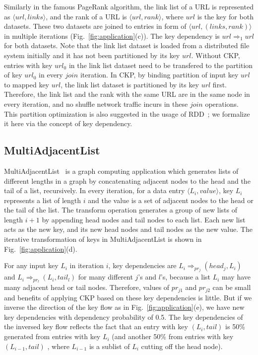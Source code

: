 \documentclass[10pt,journal,compsoc]{IEEEtran}
\begin{document}
Similarly in the famous PageRank algorithm, 
the link list of a URL is represented as $\langle url, links \rangle$,
and the rank of a URL is $\langle url, rank \rangle$, 
where $url$ is the key for both datasets. 
These two datasets are joined to entries in form of 
$\langle url, (links, rank) \rangle$ in multiple iterations (Fig.~\ref{fig:application}(c)).
The key dependency is $url \Rightarrow_{1} url$ for both datasets.
Note that the link list dataset is loaded from a distributed 
file system initially and it has not been partitioned 
by its key $url$. 
Without CKP, entries with key $url_0$ in the link list dataset need
to be transfered to the partition of key $url_0$ in every $join$ iteration.
In CKP, by binding partition of input key $url$ to mapped key $url$, 
the link list dataset is partitioned by its key $url$ first.
Therefore, the link list and the rank with the same URL 
are in the same node in every iteration, 
and no shuffle network traffic incurs in these $join$ operations. 
This partition optimization is also suggested in the usage 
of RDD~\cite{zaharia2012resilient}; 
we formalize it here via the concept of key dependency.


\subsection{MultiAdjacentList}
MultiAdjacentList~\cite{multiAdjList} is
a graph computing application which generates 
lists of different lengths in a graph by concatenating adjacent nodes 
to the head and the tail of a list, recursively.
In every iteration, for a data entry $\langle L_i, value \rangle$,
key $L_i$ represents a list of length $i$ and 
the value is a set of adjacent nodes to the head or the tail of the list.
The transform operation
generates a group of new lists of length $i+1$ by appending head
nodes and tail nodes to each list. Each new list acts as the new key, and
its new head nodes and tail nodes as the new value.
The iterative transformation of keys in MultiAdjacentList is shown in Fig.~\ref{fig:application}(d).

For any input key $L_i$ in iteration $i$, key dependencies 
are $L_i \Rightarrow_{pr_{j}} (head_{j}, L_i)$ and 
$L_i \Rightarrow_{pr_{l}} (L_i, tail_{l})$ for many different 
$j$'s and $l$'s, because a list $L_i$ may have many adjacent head
or tail nodes. Therefore, values of $pr_{j1}$ and $pr_{j2}$ can be 
small and benefits of applying CKP based on these 
key dependencies is little.
But if we inverse the direction of the key flow as 
in Fig.~\ref{fig:application}(e), we have new key dependencies with 
dependency probability of 0.5. 
The key dependencies of the inversed key flow 
reflects the fact that
an entry with key $(L_i, tail)$ is 50\% generated from entries with 
key $L_i$ (and another 50\% from entries with key $(L_{i-1}, tail)$
, where $L_{i-1}$ is a sublist of $L_i$ cutting off the head node).
\end{document}
